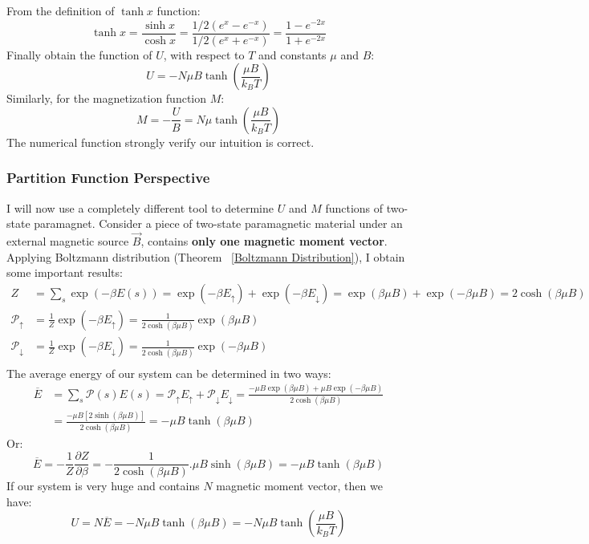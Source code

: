 \documentclass[~/PhyAI/phyai.tex]{subfiles}
\begin{document}
From the definition of $\tanh{x}$ function:
$$ \tanh{x}=\frac{\sinh{x}}{\cosh{x}}=\frac{1/2(e^{x}-e^{-x})}{1/2(e^{x}+e^{-x})}=\frac{1-e^{-2x}}{1+e^{-2x}} $$
Finally obtain the function of $U$, with respect to $T$ and constants $\mu$ and $B$:
$$ U=-N\mu B\tanh{\left(\frac{\mu B}{k_{B}T}\right)} $$
Similarly, for the magnetization function $M$:
$$ M=-\frac{U}{B}=N\mu\tanh{\left(\frac{\mu B}{k_{B}T}\right)} $$
The numerical function strongly verify our intuition is correct.
\subsubsection{Partition Function Perspective}
I will now use a completely different tool to determine $U$ and $M$ functions of two-state paramagnet. Consider a piece of two-state paramagnetic material under an external magnetic source $\vec{B}$, contains \textbf{only one magnetic moment vector}. Applying Boltzmann distribution (Theorem ~\ref{Boltzmann Distribution}), I obtain some important results:
\begin{equation*}
	\begin{split}
		Z&=\sum_{s}\exp(-\beta E(s))=\exp(-\beta E_{\uparrow})+\exp(-\beta E_{\downarrow})=\exp(\beta\mu B )+\exp(-\beta\mu B )=2\cosh{(\beta \mu B)}\\
		\mathcal{P}_{\uparrow}&=\frac{1 }{Z}\exp{(-\beta E_{\uparrow})}=\frac{1 }{2\cosh(\beta \mu B)}\exp{(\beta \mu B)}\\
		\mathcal{P}_{\downarrow}&=\frac{1 }{Z}\exp{(-\beta E_{\downarrow})}=\frac{1 }{2\cosh(\beta \mu B)}\exp{(-\beta \mu B)}\\
	\end{split}
\end{equation*}
The average energy of our system can be determined in two ways:
\begin{equation*}
	\begin{split}
		\overline{E}&=\sum_{s}\mathcal{P}(s)E(s)=\mathcal{P}_{\uparrow}E_{\uparrow}+\mathcal{P}_{\downarrow}E_{\downarrow}=\frac{-\mu B \exp{(\beta \mu B)}+\mu  B\exp{(-\beta \mu B)}}{2\cosh(\beta \mu B)}\\
		&=\frac{-\mu B[2\sinh{(\beta \mu B)}]}{2\cosh{(\beta \mu B)}}=-\mu B\tanh{(\beta \mu B)}
	\end{split}
\end{equation*}
Or:
$$ \overline{E}=-\frac{1 }{Z}\frac{\partial Z }{\partial \beta}=-\frac{1 }{2\cosh(\beta\mu B)}.\mu B\sinh{(\beta \mu B)}=-\mu B \tanh{(\beta \mu B)}$$
If our system is very huge and contains $N$ magnetic moment vector, then we have:
$$ U=N\overline{E}=-N\mu B\tanh{(\beta \mu B)}=-N\mu B\tanh{\left(\frac{\mu B}{k_{B}T}\right)} $$
\end{document}
